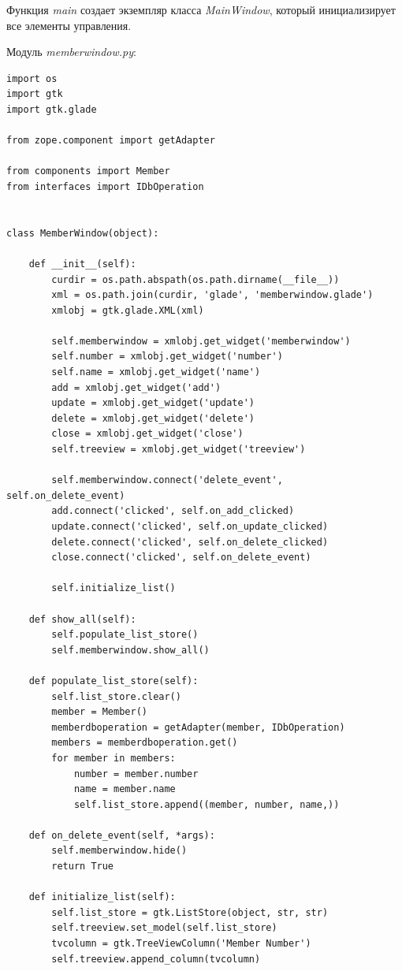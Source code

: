 \documentclass[a4paper,openany,twoside,final]{book}
\providecommand*{\DUroletitlereference}[1]{\textsl{#1}}
\begin{document}
Функция \DUroletitlereference{main} создает экземпляр класса \DUroletitlereference{MainWindow}, который инициализирует все элементы управления.

Модуль \DUroletitlereference{memberwindow.py}:

\begin{verbatim}
import os
import gtk
import gtk.glade

from zope.component import getAdapter

from components import Member
from interfaces import IDbOperation


class MemberWindow(object):

    def __init__(self):
        curdir = os.path.abspath(os.path.dirname(__file__))
        xml = os.path.join(curdir, 'glade', 'memberwindow.glade')
        xmlobj = gtk.glade.XML(xml)

        self.memberwindow = xmlobj.get_widget('memberwindow')
        self.number = xmlobj.get_widget('number')
        self.name = xmlobj.get_widget('name')
        add = xmlobj.get_widget('add')
        update = xmlobj.get_widget('update')
        delete = xmlobj.get_widget('delete')
        close = xmlobj.get_widget('close')
        self.treeview = xmlobj.get_widget('treeview')

        self.memberwindow.connect('delete_event', self.on_delete_event)
        add.connect('clicked', self.on_add_clicked)
        update.connect('clicked', self.on_update_clicked)
        delete.connect('clicked', self.on_delete_clicked)
        close.connect('clicked', self.on_delete_event)

        self.initialize_list()

    def show_all(self):
        self.populate_list_store()
        self.memberwindow.show_all()

    def populate_list_store(self):
        self.list_store.clear()
        member = Member()
        memberdboperation = getAdapter(member, IDbOperation)
        members = memberdboperation.get()
        for member in members:
            number = member.number
            name = member.name
            self.list_store.append((member, number, name,))

    def on_delete_event(self, *args):
        self.memberwindow.hide()
        return True

    def initialize_list(self):
        self.list_store = gtk.ListStore(object, str, str)
        self.treeview.set_model(self.list_store)
        tvcolumn = gtk.TreeViewColumn('Member Number')
        self.treeview.append_column(tvcolumn)


\end{verbatim}
\end{document}
